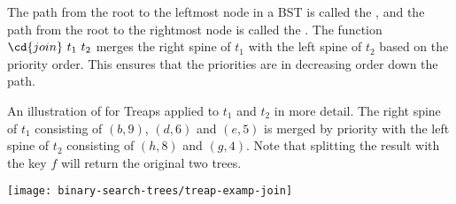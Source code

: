 The path from the root to the leftmost node in a BST is called the
, and the path from the root to the rightmost node is
called the .  The function $\cd{join}~t_1~t_2$
merges the right spine of $t_1$ with the left spine of $t_2$ based on
the priority order.  This ensures that the priorities are in
decreasing order down the path.
\begin{example}
  An illustration of  for Treaps applied to $t_1$ and $t_2$ in
  more detail.  The right spine of $t_1$ consisting of $(b,9)$,
  $(d,6)$ and $(e,5)$ is merged by priority with the left spine of
  $t_2$ consisting of $(h,8)$ and $(g,4)$.  Note that splitting the
  result with the key $f$ will return the original two trees.
\begin{center}
  \texttt{[image: binary-search-trees/treap-examp-join]}
\end{center}
\end{example}



\begin{comment}
\begin{lemma}
\label{thm:treapuniqueness}
  For a set of keys $S$, if their priorities $p(s) : s \in S$ are unique,
  then there is exactly one Treap (i.e. shape) for $S$.

\begin{proof} (By induction on size)
An empty tree is a leaf (base case).  Otherwise, the unique key $k$
with the highest priority in $S$ must be at the root.  This fixes the
keys to the left ($\csetf{k' \in S}{k' < k}$) and to the right
($\csetf{k' \in S}{k' > k}$).  By induction these are unique, so the
whole tree is unique.
\end{proof}
\end{lemma}
\end{comment}

